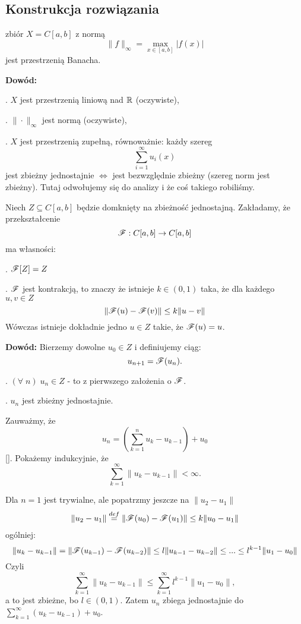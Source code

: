 \subsection{Konstrukcja rozwiązania}

 zbiór $X=C[a,b]$ z normą 
$$\|f\|_\infty=\max\limits_{x\in[a,b]}|f(x)|$$
jest przestrzenią Banacha.
\smallskip

\textbf{Dowód:}

. $X$ jest przestrzenią liniową nad $\mathbb{R}$ (oczywiste),

. $\|\cdot\|_\infty$ jest normą (oczywiste),

. $X$ jest przestrzenią zupełną, równoważnie: każdy szereg
$$\sum\limits_{i=1}^\infty u_i(x)$$
jest zbieżny jednostajnie $\iff$ jest bezwzględnie zbieżny (szereg norm jest zbieżny). Tutaj odwołujemy się do analizy i że coś takiego robiliśmy.
\proofend

 Niech $Z\subseteq C[a, b]$ będzie domknięty na zbieżność jednostajną. Zakładamy, że przekształcenie 
$$\mathcal{F}: C[a, b]\to C[a,b]$$
ma własności:

. $\mathcal{F}[Z]=Z$

. $\mathcal{F}$ jest kontrakcją, to znaczy że istnieje $k\in(0, 1)$ taka, że dla każdego $u,v\in Z$ 
$$\|\mathcal{F}(u)-\mathcal{F}(v)\|\leq k\|u-v\|$$
Wówczas istnieje dokładnie jedno $u\in Z$ takie, że $\mathcal{F}(u)=u$.

\textbf{Dowód:} Bierzemy dowolne $u_0\in Z$ i definiujemy ciąg:
$$u_{n+1}=\mathcal{F}(u_n).$$

. $(\forall\;n)\;u_n\in Z$ - to z pierwszego założenia o $\mathcal{F}$.

. $u_n$ jest zbieżny jednostajnie.

Zauważmy, że 
$$u_n=\left(\sum\limits_{k=1}^n u_k-u_{k-1}\right)+u_0$$
[]. Pokażemy indukcyjnie, że 
$$\sum\limits_{k=1}^\infty \|u_k-u_{k-1}\|<\infty.$$


Dla $n=1$ jest trywialne, ale popatrzmy jeszcze na $\|u_2-u_1\|$
\begin{align*}
    \|u_2-u_1\|\overset{def}{=}\|\mathcal{F}(u_0)-\mathcal{F}(u_1)\|\leq k\|u_0-u_1\|
\end{align*}
ogólniej:
$$\|u_k-u_{k-1}\|=\|\mathcal{F}(u_{k-1})-\mathcal{F}(u_{k-2})\|\leq l\|u_{k-1}-u_{k-2}\|\leq...\leq l^{k-1}\|u_1-u_0\|$$
Czyli
$$\sum\limits_{k=1}^\infty\|u_k-u_{k-1}\|\leq\sum\limits_{k=1}^\infty l^{k-1}\|u_1-u_0\|,$$
a to jest zbieżne, bo $l\in (0, 1)$. Zatem $u_n$ zbiega jednostajnie do $\sum\limits_{k=1}^\infty (u_{k}-u_{k-1})+u_0$.

